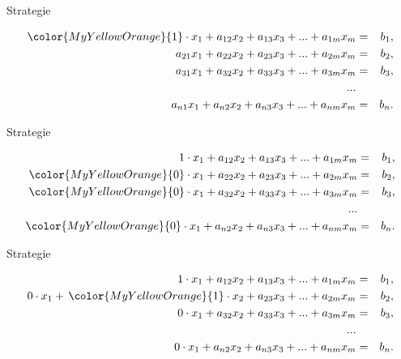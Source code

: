 \documentclass[german]{beamer}
\newcommand{\bq}{\begin{eqnarray*}}
\newcommand{\eq}{\end{eqnarray*}}
\newcommand{\superalert}[1]{{\color{MyYellowOrange}{#1}}}
\begin{document}
\begin{frame}{Strategie}

\bq
 \superalert{1} \cdot x_1 + a_{12} x_2 + a_{13} x_3 + ... + a_{1m} x_m & = & b_1,
\nonumber \\
 a_{21} x_1 + a_{22} x_2 + a_{23} x_3 + ... + a_{2m} x_m & = & b_2,
\nonumber \\
 a_{31} x_1 + a_{32} x_2 + a_{33} x_3 + ... + a_{3m} x_m & = & b_3,
\nonumber \\
 ... & & 
\nonumber \\
 a_{n1} x_1 + a_{n2} x_2 + a_{n3} x_3 + ... + a_{nm} x_m & = & b_n.
\eq

\end{frame}

\begin{frame}{Strategie}

\bq
 1 \cdot x_1 + a_{12} x_2 + a_{13} x_3 + ... + a_{1m} x_m & = & b_1,
\nonumber \\
 \superalert{0} \cdot x_1 + a_{22} x_2 + a_{23} x_3 + ... + a_{2m} x_m & = & b_2,
\nonumber \\
 \superalert{0} \cdot x_1 + a_{32} x_2 + a_{33} x_3 + ... + a_{3m} x_m & = & b_3,
\nonumber \\
 ... & & 
\nonumber \\
 \superalert{0} \cdot x_1 + a_{n2} x_2 + a_{n3} x_3 + ... + a_{nm} x_m & = & b_n.
\eq

\end{frame}

\begin{frame}{Strategie}

\bq
 1 \cdot x_1 + a_{12} x_2 + a_{13} x_3 + ... + a_{1m} x_m & = & b_1,
\nonumber \\
 0 \cdot x_1 + \,\superalert{1} \cdot x_2 + a_{23} x_3 + ... + a_{2m} x_m & = & b_2,
\nonumber \\
 0 \cdot x_1 + a_{32} x_2 + a_{33} x_3 + ... + a_{3m} x_m & = & b_3,
\nonumber \\
 ... & & 
\nonumber \\
 0 \cdot x_1 + a_{n2} x_2 + a_{n3} x_3 + ... + a_{nm} x_m & = & b_n.
\eq

\end{frame}
\end{document}
